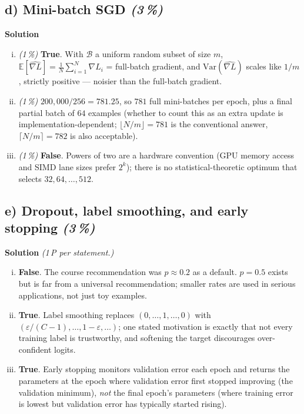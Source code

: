 \documentclass[11pt,a4paper]{article}
\newcommand{\subpoints}[1]{\textit{(#1\,\%)}}
\newcommand{\sol}{\noindent\textbf{Solution}}
\begin{document}
\subsection*{d) Mini-batch SGD \subpoints{3}}

\sol{}
\begin{enumerate}[(i)]
  \item \subpoints{1} \textbf{True}. With $\mathcal B$ a uniform random subset of size $m$,
        $\mathbb E[\widehat{\nabla L}] = \tfrac{1}{N}\sum_{i=1}^N \nabla L_i$ = full-batch gradient,
        and $\mathrm{Var}(\widehat{\nabla L})$ scales like $1/m$, strictly positive --- noisier
        than the full-batch gradient.
  \item \subpoints{1} $200{,}000 / 256 = 781.25$, so
        $\boxed{781}$ full mini-batches per epoch, plus a final partial batch of $64$ examples
        (whether to count this as an extra update is implementation-dependent; $\lfloor N/m \rfloor
        = 781$ is the conventional answer, $\lceil N/m \rceil = 782$ is also acceptable).
  \item \subpoints{1} \textbf{False}. Powers of two are a hardware convention (GPU memory access
        and SIMD lane sizes prefer $2^k$); there is no statistical-theoretic optimum that selects
        $32, 64, \dots, 512$.
\end{enumerate}

\subsection*{e) Dropout, label smoothing, and early stopping \subpoints{3}}

\sol{} \emph{(1\,P per statement.)}
\begin{enumerate}[(i)]
  \item \textbf{False}. The course recommendation was $p \approx 0.2$ as a default. $p=0.5$ exists
        but is far from a universal recommendation; smaller rates are used in serious applications,
        not just toy examples.
  \item \textbf{True}. Label smoothing replaces $(0,\dots,1,\dots,0)$ with
        $(\varepsilon/(C-1),\dots,1-\varepsilon,\dots)$; one stated motivation is exactly that not
        every training label is trustworthy, and softening the target discourages over-confident
        logits.
  \item \textbf{True}. Early stopping monitors validation error each epoch and returns the
        parameters at the epoch where validation error first stopped improving (the validation
        minimum), \emph{not} the final epoch's parameters (where training error is lowest but
        validation error has typically started rising).
\end{enumerate}
\end{document}
